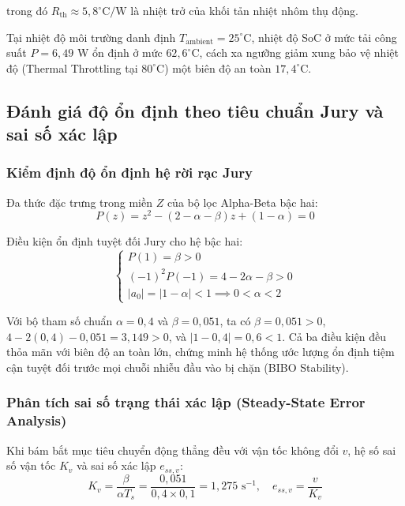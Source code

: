 trong đó $R_{\text{th}} \approx 5{,}8^\circ\text{C/W}$ là nhiệt trở của khối tản nhiệt nhôm thụ động.

Tại nhiệt độ môi trường danh định $T_{\text{ambient}} = 25^\circ\text{C}$, nhiệt độ SoC ở mức tải công suất $P = 6{,}49$ W ổn định ở mức $62{,}6^\circ\text{C}$, cách xa ngưỡng giảm xung bảo vệ nhiệt độ (Thermal Throttling tại $80^\circ\text{C}$) một biên độ an toàn $17{,}4^\circ\text{C}$.

\subsection{Đánh giá độ ổn định theo tiêu chuẩn Jury và sai số xác lập}

\subsubsection{Kiểm định độ ổn định hệ rời rạc Jury}

\hspace{0.5cm} Đa thức đặc trưng trong miền $Z$ của bộ lọc Alpha-Beta bậc hai:
\begin{equation}
P(z) = z^2 - (2 - \alpha - \beta)z + (1 - \alpha) = 0
\label{eq:jury-characteristic-polynomial}
\end{equation}

Điều kiện ổn định tuyệt đối Jury cho hệ bậc hai:
\begin{equation}
\begin{cases}
P(1) = \beta > 0 \\
(-1)^2 P(-1) = 4 - 2\alpha - \beta > 0 \\
|a_0| = |1 - \alpha| < 1 \implies 0 < \alpha < 2
\end{cases}
\label{eq:jury-stability-conditions}
\end{equation}

Với bộ tham số chuẩn $\alpha = 0{,}4$ và $\beta = 0{,}051$, ta có $\beta = 0{,}051 > 0$, $4 - 2(0{,}4) - 0{,}051 = 3{,}149 > 0$, và $|1 - 0{,}4| = 0{,}6 < 1$. Cả ba điều kiện đều thỏa mãn với biên độ an toàn lớn, chứng minh hệ thống ước lượng ổn định tiệm cận tuyệt đối trước mọi chuỗi nhiễu đầu vào bị chặn (BIBO Stability).

\subsubsection{Phân tích sai số trạng thái xác lập (Steady-State Error Analysis)}

\hspace{0.5cm} Khi bám bắt mục tiêu chuyển động thẳng đều với vận tốc không đổi $v$, hệ số sai số vận tốc $K_v$ và sai số xác lập $e_{ss, v}$:
\begin{equation}
K_v = \frac{\beta}{\alpha T_s} = \frac{0{,}051}{0{,}4 \times 0{,}1} = 1{,}275\text{ s}^{-1}, \quad e_{ss, v} = \frac{v}{K_v}
\label{eq:velocity-steady-state-error}
\end{equation}

